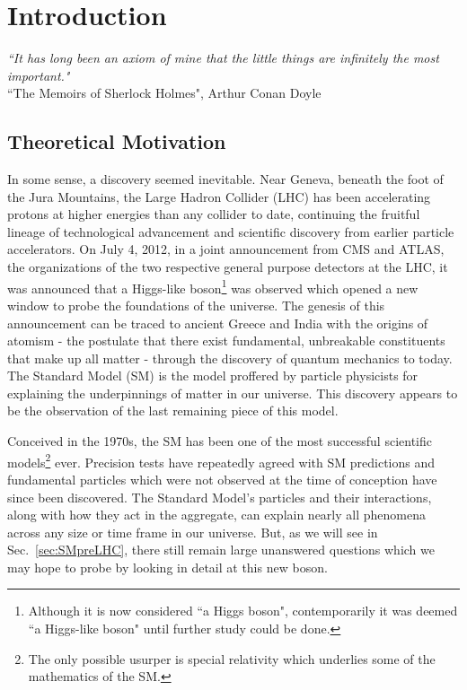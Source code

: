 \chapter{Introduction}
\label{sec:intro}

\begin{center}
\begin{footnotesize}
{ \it{``It has long been an axiom of mine that the little things are infinitely the most important."}}\\
``The Memoirs of Sherlock Holmes", Arthur Conan Doyle\\
\end{footnotesize}
\end{center}

\section{Theoretical Motivation}
\label{sec:introduction}

In some sense, a discovery seemed inevitable. Near Geneva, beneath the foot of the Jura Mountains, the Large Hadron Collider (LHC) has been accelerating protons at higher energies than any collider to date, continuing the fruitful lineage of technological advancement and scientific discovery from earlier particle accelerators. On July 4, 2012, in a joint announcement from CMS and ATLAS, the organizations of the two respective general purpose detectors at the LHC, it was announced that a Higgs-like boson\footnote{Although it is now considered ``a Higgs boson", contemporarily it was deemed ``a Higgs-like boson" until further study could be done.} was observed which opened a new window to probe the foundations of the universe. The genesis of this announcement can be traced to ancient Greece and India with the origins of atomism - the postulate that there exist fundamental, unbreakable constituents that make up all matter - through the discovery of quantum mechanics to today. The Standard Model (SM) is the model proffered by particle physicists for explaining the underpinnings of matter in our universe. This discovery appears to be the observation of the last remaining piece of this model.

Conceived in the 1970s, the SM has been one of the most successful scientific models\footnote{The only possible usurper is special relativity which underlies some of the mathematics of the SM.} ever. Precision tests have repeatedly agreed with SM predictions and fundamental particles which were not observed at the time of conception have since been discovered. The Standard Model's particles and their interactions, along with how they act in the aggregate, can explain nearly all phenomena across any size or time frame in our universe. But, as we will see in Sec.~\ref{sec:SMpreLHC}, there still remain large unanswered questions which we may hope to probe by looking in detail at this new boson.

